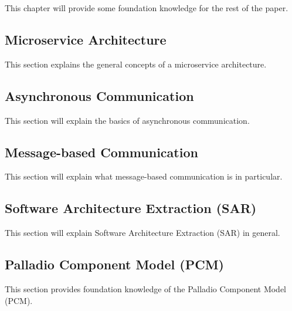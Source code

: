 This chapter will provide some foundation knowledge for the rest of the paper.

\subsection{Microservice Architecture}
\label{sec:Foundation:MicroserviceArchitecture}
This section explains the general concepts of a microservice architecture.
\cite{Dragoni2017}

\subsection{Asynchronous Communication}
\label{sec:Foundation:AsyncCommunication}
This section will explain the basics of asynchronous communication.

\subsection{Message-based Communication}
\label{sec:Foundation:MessageBasedCommunication}
This section will explain what message-based communication is in particular.

\subsection{Software Architecture Extraction (SAR)}
\label{sec:Foundation:SAR}
This section will explain Software Architecture Extraction (SAR) in general.

\subsection{Palladio Component Model (PCM)}
\label{sec:Foundation:PCM}
This section provides foundation knowledge of the Palladio Component Model (PCM).
\cite{Becker2008}